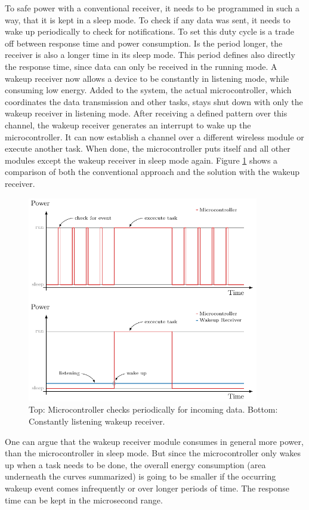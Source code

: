 To safe power with a conventional receiver, it needs to be programmed in such a way, that it is kept in a sleep mode.
To check if any data was sent, it needs to wake up periodically to check for notifications.
To set this duty cycle is a trade off between response time and power consumption.
Is the period longer, the receiver is also a longer time in its sleep mode.
This period defines also directly the response time, since data can only be received in the running mode.
A wakeup receiver now allows a device to be constantly in listening mode, while consuming low energy.
Added to the system, the actual microcontroller, which coordinates the data transmission and other tasks, stays shut down with only the wakeup receiver in listening mode.
After receiving a defined pattern over this channel, the wakeup receiver generates an interrupt to wake up the microcontroller. 
It can now establish a channel over a different wireless module or execute another task.
When done, the microcontroller puts itself and all other modules except the wakeup receiver in sleep mode again.
Figure \ref{theory:wake} shows a comparison of both the conventional approach and the solution with the wakeup receiver. 
\begin{figure}[ht]
	\centering
	\includegraphics[width=0.9\textwidth]{2-theory/wakeup/graphics/wake_comp.pdf}
	\caption{Top: Microcontroller checks periodically for incoming data. Bottom: Constantly listening  wakeup receiver.\label{theory:wake}}
\end{figure}
One can argue that the wakeup receiver module consumes in general more power, than the microcontroller in sleep mode.
But since the microcontroller only wakes up when a task needs to be done, the overall energy consumption (area underneath the curves summarized) is going to be smaller if the occurring wakeup event comes infrequently or over longer periods of time.
The response time can be kept in the microsecond range.